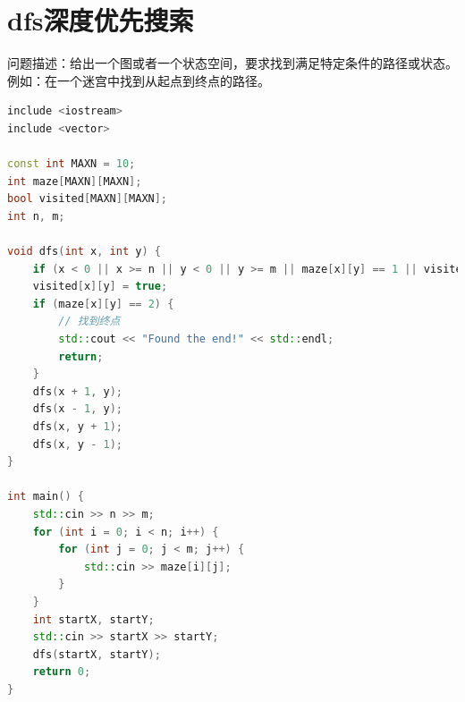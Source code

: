 \documentclass[12pt,twiside,a4paper]{ctexbook}
\numberwithin{chapter}{part}
\begin{document}
\section{dfs深度优先搜索}
问题描述：给出一个图或者一个状态空间，要求找到满足特定条件的路径或状态。\\
例如：在一个迷宫中找到从起点到终点的路径。
\begin{lstlisting}[language=C++]
include <iostream>
include <vector>

const int MAXN = 10;
int maze[MAXN][MAXN];
bool visited[MAXN][MAXN];
int n, m;

void dfs(int x, int y) {
    if (x < 0 || x >= n || y < 0 || y >= m || maze[x][y] == 1 || visited[x][y]) return;
    visited[x][y] = true;
    if (maze[x][y] == 2) {
        // 找到终点
        std::cout << "Found the end!" << std::endl;
        return;
    }
    dfs(x + 1, y);
    dfs(x - 1, y);
    dfs(x, y + 1);
    dfs(x, y - 1);
}

int main() {
    std::cin >> n >> m;
    for (int i = 0; i < n; i++) {
        for (int j = 0; j < m; j++) {
            std::cin >> maze[i][j];
        }
    }
    int startX, startY;
    std::cin >> startX >> startY;
    dfs(startX, startY);
    return 0;
}
\end{lstlisting}
\end{document}
